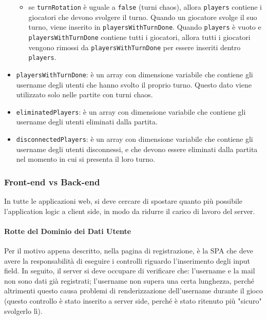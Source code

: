 \begin{itemize}
\begin{itemize}
	\item
		se \texttt{turnRotation} è uguale a \texttt{false} (turni chaos), allora \texttt{players} contiene i giocatori che devono svolgere il turno. Quando un giocatore svolge il suo turno, viene inserito in \texttt{playersWithTurnDone}. Quando \texttt{players} è vuoto e \texttt{playersWithTurnDone} contiene tutti i giocatori, allora tutti i giocatori vengono rimossi da \texttt{playersWithTurnDone} per essere inseriti dentro \texttt{players}.
	\end{itemize}
\item
	\texttt{playersWithTurnDone}: è un array con dimensione variabile che contiene gli username degli utenti che hanno svolto il proprio turno.
	\newline
	Questo dato viene utilizzato solo nelle partite con turni chaos.
\item
	\texttt{eliminatedPlayers}: è un array con dimensione variabile che contiene gli username degli utenti eliminati dalla partita.
\item
	\texttt{disconnectedPlayers}: è un array con dimensione variabile che contiene gli username degli utenti disconnessi, e che devono essere eliminati dalla partita nel momento in cui si presenta il loro turno.
\end{itemize}

\subsubsection{Front-end vs Back-end}
\label{front-end vs back-end}

In tutte le applicazioni web, si deve cercare di spostare quanto più possibile l'application logic a client side, in modo da ridurre il carico di lavoro del server.

\paragraph{Rotte del Dominio dei Dati Utente \paragraphNewline}

\removeHorizontalSpaceSmall Per il motivo appena descritto, nella pagina di registrazione, è la SPA che deve avere la responsabilità di eseguire i controlli riguardo l'inserimento degli input field. In seguito, il server si deve occupare di verificare che: l'username e la mail non sono dati già registrati; l'username non supera una certa lunghezza, perché altrimenti questo causa problemi di renderizzazione dell'username durante il gioco (questo controllo è stato inserito a server side, perché è stato ritenuto più "sicuro" svolgerlo lì).

